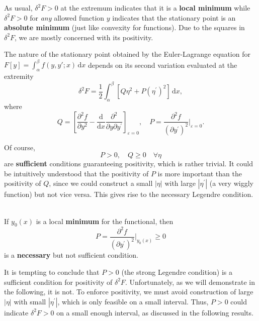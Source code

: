 \documentclass{article}
\theoremstyle{nonumberplain}
\begin{document}
As usual, $\delta ^2 F > 0 $ at the extremum indicates that it is a \textbf{local minimum} while $\delta ^2 F > 0$ for \textit{any} allowed function $y$ indicates that the stationary point is an \textbf{absolute minimum} (just like convexity for functions). Due to the squares in $\delta ^2 F$, we are mostly concerned with its positivity. 
\begin{frm-res} \label{res:second-variation}
    The nature of the stationary point obtained by the Euler-Lagrange equation for $F[y] = \int_{\alpha }^{\beta } f(y,y' ; x ) \,\mathrm{d}x$ depends on its second variation evaluated at the extremity 
    \[
        \delta ^2 F = 
        \frac{1}{2} \int_{\alpha }^{\beta } \left[ Q \eta ^2 + P (\eta ^\prime )^{2} \right] \,\mathrm{d}x, 
    \]
    where 
    \[
        Q = \left[ \frac{\partial ^2f}{\partial y^2} - \frac{\mathrm{d}}{\mathrm{d}x} \frac{\partial ^2}{\partial y \partial y^\prime } \right]_{\varepsilon =0}, \quad 
        P = \frac{\partial ^2f}{(\partial y^\prime )^{2} } \bigg \rvert_{\varepsilon =0 }. 
    \]
\end{frm-res}
Of course, 
\[
    P>0, \quad Q \geq 0 \quad \forall \eta 
\]
are \textbf{sufficient} conditions guaranteeing positivity, which is rather trivial. It could be intuitively understood that the positivity of $P$ is more important than the positivity of $Q$, since we could construct a small $\left\vert \eta  \right\vert $ with large $\left\vert \eta ^\prime  \right\vert $ (a very wiggly function) but not vice versa. This gives rise to the necessary Legendre condition. 
\begin{frm-res}
    \quad \\
    If $y_0(x)$ is a local \textbf{minimum} for the functional, then 
    \[
        P = \frac{\partial ^2f}{(\partial y^\prime )^{2} } \bigg \rvert_{y_0(x) } \geq 0
    \]
    is a \textbf{necessary} but not sufficient condition. 
\end{frm-res}

It is tempting to conclude that $P>0$ (the strong Legendre condition) is a sufficient condition for positivity of $\delta ^2 F$. Unfortunately, as we will demonstrate in the following, it is not. To enforce positivity, we must avoid construction of large $\left\vert \eta  \right\vert $ with small $\left\vert \eta ^\prime  \right\vert $, which is only feasible on a small interval. Thus, $P > 0$ could indicate $\delta ^2 F >0$ on a small enough interval, as discussed in the following results. 
\end{document}
